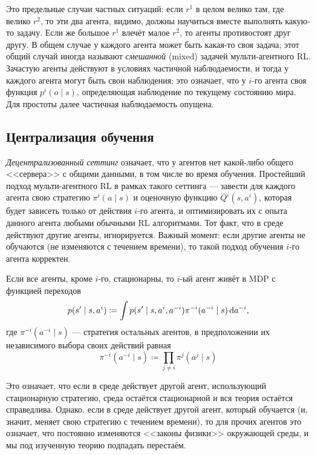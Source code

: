 Это предельные случаи частных ситуаций: если $r^1$ в целом велико там, где велико $r^2$, то эти два агента, видимо, должны научиться вместе выполнять какую-то задачу. Если же большое $r^1$ влечёт малое $r^2$, то агенты противостоят друг другу. В общем случае у каждого агента может быть какая-то своя задача; этот общий случай иногда называют \emph{смешанной} (mixed) задачей мульти-агентного RL. Зачастую агенты действуют в условиях частичной наблюдаемости, и тогда у каждого агента могут быть свои наблюдения; это означает, что у $i$-го агента своя функция $p^i(o \mid s)$, определяющая наблюдение по текущему состоянию мира. Для простоты далее частичная наблюдаемость опущена. 

\subsection{Централизация обучения}

\emph{Децентрализованный сеттинг} означает, что у агентов нет какой-либо общего <<сервера>> с общими данными, в том числе во время обучения. Простейший подход мульти-агентного RL в рамках такого сеттинга --- завести для каждого агента свою стратегию $\pi^i(a \mid s)$ и оценочную функцию $Q^i(s, a^i)$, которая будет зависеть только от действия $i$-го агента, и оптимизировать их с опыта данного агента любыми обычными RL алгоритмами. Тот факт, что в среде действуют другие агенты, игнорируется. Важный момент: если другие агенты не обучаются (не изменяются с течением времени), то такой подход обучения $i$-го агента корректен.

\begin{proposition}
Если все агенты, кроме $i$-го, стационарны, то $i$-ый агент живёт в MDP с функцией переходов
$$p(s' \mid s, a^i) \coloneqq \int p(s' \mid s, a^i, a^{-i})\pi^{-i}(a^{-i} \mid s) \mathop{}\!\mathrm{d} a^{-i},$$
где $\pi^{-i}(a^{-i} \mid s)$ --- стратегия остальных агентов, в предположении их независимого выбора своих действий равная
$$\pi^{-i}(a^{-i} \mid s) \coloneqq \prod_{j \ne i} \pi^j(a^j \mid s)$$
\end{proposition}

Это означает, что если в среде действует другой агент, использующий стационарную стратегию, среда остаётся стационарной и вся теория остаётся справедлива. Однако, если в среде действует другой агент, который обучается (и, значит, меняет свою стратегию с течением времени), то для прочих агентов это означает, что постоянно изменяются <<законы физики>> окружающей среды, и мы под изученную теорию подпадать перестаём. 

